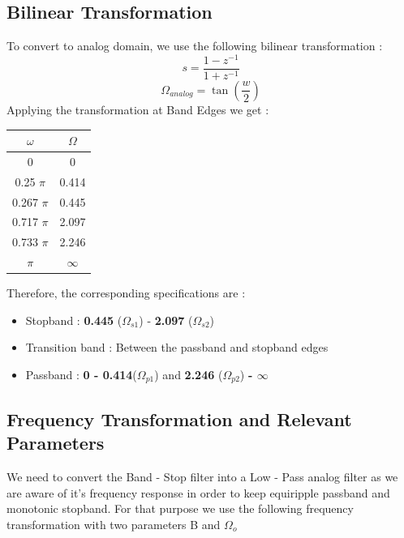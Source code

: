 \documentclass{article}
\begin{document}
\subsection{Bilinear Transformation}
To convert to analog domain, we use the following bilinear transformation :
\begin{equation*}
    s = \frac{1 - z^{-1}}{1 + z^{-1}}
\end{equation*}
\begin{equation*}
    \Omega_{analog} = \tan (\frac{w}{2})
\end{equation*}
Applying the transformation at Band Edges we get :
\begin{table}[H]
    \begin{center}
    \begin{tabular}{|c|c|}
        \hline
        $\omega$ & $\Omega$\\
        
        \hline
            0 & 0\\
            \hline
            0.25 $\pi$ & 0.414 \\
            \hline
            0.267 $\pi$ & 0.445\\
            \hline
            0.717 $\pi$ & 2.097\\
            \hline
            0.733 $\pi$ & 2.246\\
            \hline
            $\pi$ & $\infty$\\
            \hline
        
    \end{tabular}
    \end{center}
\end{table}


Therefore, the corresponding specifications are :
\begin{itemize}
    \item Stopband :  \textbf{0.445} ($\Omega_{s1}$) - \textbf{2.097} ($\Omega_{s2}$)
    \item  Transition band : Between the passband and stopband edges
    \item Passband : \textbf{0 - 0.414}($\Omega_{p1}$) and \textbf{2.246} ($\Omega_{p2}$) \textbf{- $\infty$}
\end{itemize}


\subsection{Frequency Transformation and Relevant Parameters}
We need to convert the Band - Stop filter into a Low - Pass analog filter as we are aware of it's frequency response in order to keep equiripple passband and monotonic stopband. For that purpose we use the following frequency transformation with two parameters B and $\Omega_o$
\end{document}
